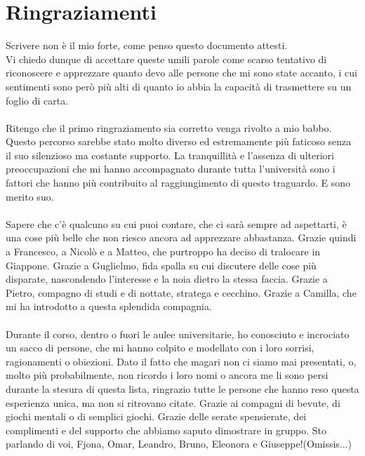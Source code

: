 \chapter*{Ringraziamenti}

Scrivere non è il mio forte, come penso questo documento attesti.\\
Vi chiedo dunque di accettare queste umili parole
come scarso tentativo di riconoscere e apprezzare quanto devo
alle persone che mi sono state accanto,
i cui sentimenti sono però più alti di quanto io
abbia la capacità di trasmettere su un foglio di carta.\\
\\
Ritengo che il primo ringraziamento sia corretto venga rivolto a mio babbo.
Questo percorso sarebbe stato molto diverso ed
estremamente più faticoso senza il suo silenzioso ma costante supporto.
La tranquillità e l'assenza di ulteriori preoccupazioni
che mi hanno accompagnato durante tutta l'università sono
i fattori che hanno più contribuito al raggiungimento di questo traguardo.
E sono merito suo.\\
\\
Sapere che c'è qualcuno su cui puoi contare,
che ci sarà sempre ad aspettarti, 
è una cose più belle che non riesco ancora ad apprezzare abbastanza.
Grazie quindi a Francesco, a Nicolò e a Matteo, che purtroppo ha deciso di tralocare in Giappone.
Grazie a Guglielmo, fida spalla su cui discutere delle cose più disparate,
nascondendo l'interesse e la noia dietro la stessa faccia.
Grazie a Pietro, compagno di studi e di nottate,
stratega e cecchino.
Grazie a Camilla, che mi ha introdotto a questa splendida compagnia.\\
\\
Durante il corso, dentro o fuori le aulee universitarie,
ho conosciuto e incrociato un sacco di persone,
che mi hanno colpito e modellato con i loro sorrisi,
ragionamenti o obiezioni.
Dato il fatto che magari non ci siamo mai presentati,
o, molto più probabilmente, non ricordo i loro nomi o
ancora me li sono persi durante la stesura di questa lista,
ringrazio tutte le persone che hanno reso questa esperienza unica, 
ma non si ritrovano citate.
\clearpage
Grazie ai compagni di bevute, di giochi mentali o di semplici giochi.
Grazie delle serate spensierate, dei complimenti 
e del supporto che abbiamo saputo dimostrare in gruppo.
Sto parlando di voi, Fjona, Omar, Leandro, Bruno, Eleonora e Giuseppe!(Omissis...)\\
\\
